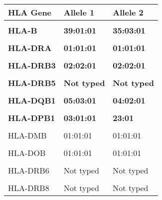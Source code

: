 \documentclass[
]{article}
\begin{document}
\begingroup\fontsize{9}{11}\selectfont

\begin{tabular}{lll}
\toprule
HLA Gene & Allele 1 & Allele 2\\
\midrule
\textbf{\cellcolor{gray!6}{HLA-A}} & \textbf{\cellcolor{gray!6}{03:01:01}} & \textbf{\cellcolor{gray!6}{31:01:02}}\\
\textbf{HLA-B} & \textbf{39:01:01} & \textbf{35:03:01}\\
\textbf{\cellcolor{gray!6}{HLA-C}} & \textbf{\cellcolor{gray!6}{12:03:01}} & \textbf{\cellcolor{gray!6}{04:01:01}}\\
\textbf{HLA-DRA} & \textbf{01:01:01} & \textbf{01:01:01}\\
\textbf{\cellcolor{gray!6}{HLA-DRB1}} & \textbf{\cellcolor{gray!6}{08:01:03}} & \textbf{\cellcolor{gray!6}{14:54:01}}\\
\addlinespace
\textbf{HLA-DRB3} & \textbf{02:02:01} & \textbf{02:02:01}\\
\textbf{\cellcolor{gray!6}{HLA-DRB4}} & \textbf{\cellcolor{gray!6}{Not typed}} & \textbf{\cellcolor{gray!6}{Not typed}}\\
\textbf{HLA-DRB5} & \textbf{Not typed} & \textbf{Not typed}\\
\textbf{\cellcolor{gray!6}{HLA-DQA1}} & \textbf{\cellcolor{gray!6}{04:01:01}} & \textbf{\cellcolor{gray!6}{01:04:01}}\\
\textbf{HLA-DQB1} & \textbf{05:03:01} & \textbf{04:02:01}\\
\addlinespace
\textbf{\cellcolor{gray!6}{HLA-DPA1}} & \textbf{\cellcolor{gray!6}{01:03:01}} & \textbf{\cellcolor{gray!6}{01:03:01}}\\
\textbf{HLA-DPB1} & \textbf{03:01:01} & \textbf{23:01}\\
\cellcolor{gray!6}{HLA-DMA} & \cellcolor{gray!6}{01:01:01} & \cellcolor{gray!6}{01:01:01}\\
HLA-DMB & 01:01:01 & 01:01:01\\
\cellcolor{gray!6}{HLA-DOA} & \cellcolor{gray!6}{01:01:02} & \cellcolor{gray!6}{01:01:01}\\
\addlinespace
HLA-DOB & 01:01:01 & 01:01:01\\
\cellcolor{gray!6}{HLA-DRB2} & \cellcolor{gray!6}{01:01} & \cellcolor{gray!6}{01:01}\\
HLA-DRB6 & Not typed & Not typed\\
\cellcolor{gray!6}{HLA-DRB7} & \cellcolor{gray!6}{Not typed} & \cellcolor{gray!6}{Not typed}\\
HLA-DRB8 & Not typed & Not typed\\

\end{tabular}
\end{document}
